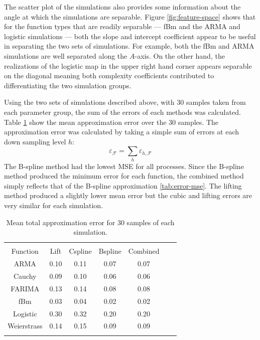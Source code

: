 The scatter plot of the simulations also provides some information 
about the angle at which the simulations are separable.
 Figure \ref{fig:feature-space} shows that for the function types that are readily separable --- fBm and the ARMA and logistic simulations ---  both the slope and intercept coefficient appear to be useful in separating the two sets of simulations. For example, both the fBm and ARMA simulations are well separated along the $A$-axis. On the other hand, the realizations of the logistic map in the upper right hand corner appears separable on the diagonal meaning both complexity coefficients contributed to differentiating the two simulation groups.

Using the two sets of simulations described above, with 30 samples taken from each parameter group, the sum of the errors of 
each methods was calculated. 
Table \ref{tab:epsilons-all} show the mean approximation error 
over the 30 samples. The approximation error was calculated by 
taking a simple sum of errors at each down sampling level $h$: 
\[
  \varepsilon_{\mathcal{F}} = \sum_{h} \varepsilon_{h, \mathcal{F}}
\]
The B-spline method had the lowest MSE for all processes.
Since the B-spline method produced the minimum 
error for each function, the combined method 
simply reflects that of the B-spline approximation
\ref{tab:error-mse}.
The lifting method produced a slightly lower mean error but 
the cubic and lifting errors are very similar for each
simulation. 

\begin{table}[!htbp] \centering 
\begin{tabular}{@{\extracolsep{1pt}} ccccccc} 
\\[-1.8ex]\hline 
\hline \\[-1.8ex] 
  Function & Lift & Cspline & Bspline & Combined \\ \hline 
ARMA       & 0.10  & 0.11    & 0.07 & 0.07 \\ 
Cauchy       & 0.09  & 0.10  & 0.06 & 0.06 \\ 
FARIMA       & 0.13  & 0.14  & 0.08 & 0.08 \\ 
fBm          & 0.03  & 0.04  & 0.02 & 0.02 \\ 
Logistic     & 0.30  & 0.32  & 0.20 & 0.20 \\ 
Weierstrass  & 0.14  & 0.15  & 0.09 & 0.09 \\ 
\hline \\[-1.8ex] 
          \end{tabular} 
  \caption{Mean total approximation error for 30 samples of each simulation. 
             }
  \label{tab:epsilons-all}
\end{table}


